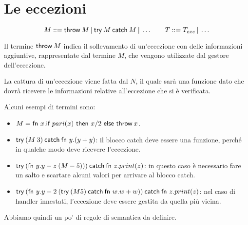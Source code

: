 

\section{Le eccezioni}

$$
M ::= \text{throw} \: M \vbar \text{try} \: M \: \text{catch} \: M \vbar \ldots
\qquad
T ::= \TExc \vbar \ldots
$$

Il termine $\throw{M}$ indica il sollevamento di un'eccezione con delle informazioni aggiuntive, rappresentate dal termine $M$, che vengono utilizzate dal gestore dell'eccezione.

La cattura di un'eccezione viene fatta dal  $N$, il quale sarà una funzione dato che dovrà ricevere le informazioni relative all'eccezione che si è verificata.

\noindent Alcuni esempi di termini sono:

\begin{itemize}
	\item $M = \fn x. \IF{pari(x)}{x/2}{\throw{x}}$.
	\item $\trycatch{(M \: 3)}{\fn y.(y+y)}$: il blocco catch deve essere una funzione, perché in qualche modo deve ricevere l'eccezione.
	\item $\trycatch{(\fn y.y-z \: (M-5)))}{\fn z.print(z)}$: in questo caso è necessario fare un salto e scartare alcuni valori per arrivare al blocco catch.
	\item $\trycatch{(\fn y.y-2 \: (\trycatch{(M 5)}{\fn w.w+w}))}{\fn z.print(z)}$: nel caso di handler innestati, l'eccezione deve essere gestita da quella più vicina.
\end{itemize}

\noindent Abbiamo quindi un po' di regole di semantica da definire.

